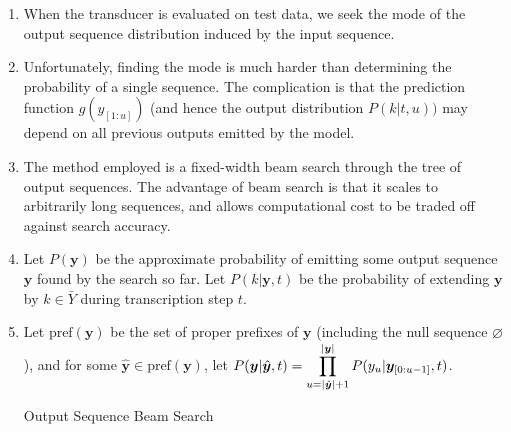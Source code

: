 \begin{enumerate}
    \item When the transducer is evaluated on test data, we seek the mode of the output sequence distribution induced by the input sequence.
    \hfill \cite{arxiv/1211.3711/Sequence-Transduction-RNN}

    \item Unfortunately, finding the mode is much harder than determining the probability of a single sequence. 
    The complication is that the prediction function $g(y_{[1:u]})$ (and hence the output distribution $P(k|t, u))$ may depend on all previous outputs emitted by the model.
    \hfill \cite{arxiv/1211.3711/Sequence-Transduction-RNN}

    \item The method employed is a fixed-width beam search through the tree of output sequences. 
    The advantage of beam search is that it scales to arbitrarily long sequences, and allows computational cost to be traded off against search accuracy.
    \hfill \cite{arxiv/1211.3711/Sequence-Transduction-RNN}

    \item Let $P(\bm{y})$ be the approximate probability of emitting some output sequence $\bm{y}$ found by the search so far.
    Let $P(k|\bm{y}, t)$ be the probability of extending $\bm{y}$ by $k \in \bar{Y}$ during transcription step $t$.
    \hfill \cite{arxiv/1211.3711/Sequence-Transduction-RNN}

    \item Let $\text{pref} (\bm{y})$ be the set of proper prefixes of $\bm{y}$ (including the null sequence $\varnothing$), and for some $\hat{\bm{y}} \in \text{pref} (\bm{y})$, let $P(\bm{y}| \hat{\bm{y}}, t) = \displaystyle\prod^{\left| \bm{y} \right|} _{u=\left| \hat{\bm{y}} \right|+1} P(y_u|\bm{y}_{[0:u-1]}, t)$. 
    \hfill \cite{arxiv/1211.3711/Sequence-Transduction-RNN}

\begin{algorithm}[H]
    \caption{Output Sequence Beam Search \cite{arxiv/1211.3711/Sequence-Transduction-RNN}} 


\end{algorithm}
\end{enumerate}
